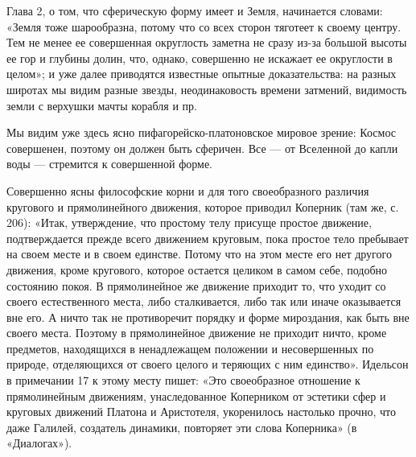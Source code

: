 Глава 2, о том, что сферическую форму имеет и Земля, начинается
словами: «Земля тоже шарообразна, потому что со всех сторон тяготеет к
своему центру. Тем не менее ее совершенная округлость заметна не сразу
из-за большой высоты ее гор и глубины долин, что, однако, совершенно
не искажает ее округлости в целом»; и уже далее приводятся известные
опытные доказательства: на разных широтах мы видим разные звезды,
неодинаковость времени затмений, видимость земли с верхушки мачты
корабля и пр.

Мы видим уже здесь ясно пифагорейско-платоновское мировое зрение:
Космос совершенен, поэтому он должен быть сферичен. Все --- от
Вселенной до капли воды --- стремится к совершенной форме.

Совершенно ясны философские корни и для того своеобразного различия
кругового и прямолинейного движения, которое приводил Коперник (там
же, с. 206): «Итак, утверждение, что простому телу присуще простое
движение, подтверждается прежде всего движением круговым, пока простое
тело пребывает на своем месте и в своем единстве. Потому что на этом
месте его нет другого движения, кроме кругового, которое остается
целиком в самом себе, подобно состоянию покоя. В прямолинейное же
движение приходит то, что уходит со своего естественного места, либо
сталкивается, либо так или иначе оказывается вне его. А ничто так не
противоречит порядку и форме мироздания, как быть вне своего места.
Поэтому в прямолинейное движение не приходит ничто, кроме предметов,
находящихся в ненадлежащем положении и несовершенных по природе,
отделяющихся от своего целого и теряющих с ним единство». Идельсон в
примечании 17 к этому месту пишет: «Это своеобразное отношение к
прямолинейным движениям, унаследованное Коперником от эстетики сфер и
круговых движений Платона и Аристотеля, укоренилось настолько прочно,
что даже Галилей, создатель динамики, повторяет эти слова Коперника»
(в «Диалогах»).

